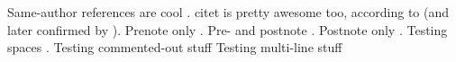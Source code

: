 

Same-author references are cool \citep{foo2010, foo2011lorem, foo2011ipsum, foo2012, foo2011dolor, bar2013}.
citet is pretty awesome too, according to \citet{foo2010} (and later confirmed by \cite{bar2013}).
Prenote only \citep[e.g.][]{foo2011lorem}.
Pre- and postnote \citep[e.g.][and references therein]{foo2011ipsum, foo2011dolor}.
Postnote only \citep[and references therein]{foo2010}.
Testing spaces \citep [pre] [post] {foo2011lorem, bar2013}.
Testing commented-out stuff %
Testing multi-line stuff \citep{foo2010, foo2011dolor,
bar2013}


